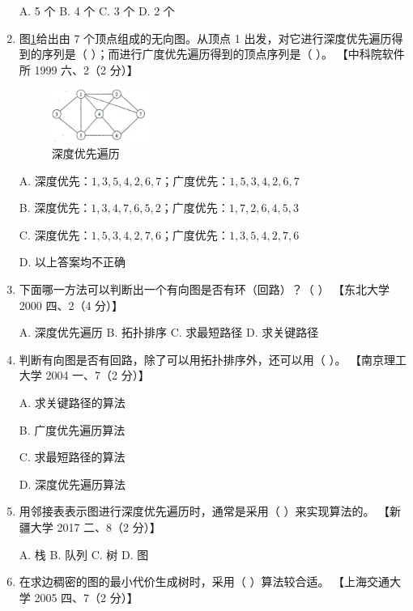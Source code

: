 \documentclass[lang=cn,newtx,10pt,scheme=chinese]{../../elegantbook}
\begin{document}
\begin{enumerate}
        A. 5 个 \quad B. 4 个 \quad C. 3 个 \quad D. 2 个  
    
        \item 图\ref{fig:7-54}给出由 7 个顶点组成的无向图。从顶点 1 出发，对它进行深度优先遍历得到的序列是（ ）；而进行广度优先遍历得到的顶点序列是（ ）。  
        【中科院软件所 1999 六、2（2 分）】  

        \begin{figure}[h!]
            \centering
            \includegraphics[width=0.3\textwidth]{../../figure/exercisePicPDF/chapter7/7-54.pdf}
            \caption{深度优先遍历}
            \label{fig:7-54}
    \end{figure}
        A. 深度优先：$1, 3, 5, 4, 2, 6, 7$；广度优先：$1, 5, 3, 4, 2, 6, 7$  

        B. 深度优先：$1, 3, 4, 7, 6, 5, 2$；广度优先：$1, 7, 2, 6, 4, 5, 3$  

        C. 深度优先：$1, 5, 3, 4, 2, 7, 6$；广度优先：$1, 3, 5, 4, 2, 7, 6$  

        D. 以上答案均不正确  
    
        \item 下面哪一方法可以判断出一个有向图是否有环（回路）？（ ）  
        【东北大学 2000 四、2（4 分）】  

        A. 深度优先遍历 \quad B. 拓扑排序 \quad C. 求最短路径 \quad D. 求关键路径  
    
        \item 判断有向图是否有回路，除了可以用拓扑排序外，还可以用（ ）。  
        【南京理工大学 2004 一、7（2 分）】  

        A. 求关键路径的算法  

        B. 广度优先遍历算法  

        C. 求最短路径的算法  

        D. 深度优先遍历算法  
    
        \item 用邻接表表示图进行深度优先遍历时，通常是采用（ ）来实现算法的。  
        【新疆大学 2017 二、8（2 分）】  

        A. 栈 \quad B. 队列 \quad C. 树 \quad D. 图  
    
        \item 在求边稠密的图的最小代价生成树时，采用（ ）算法较合适。  
        【上海交通大学 2005 四、7（2 分）】  
        

\end{enumerate}
\end{document}
